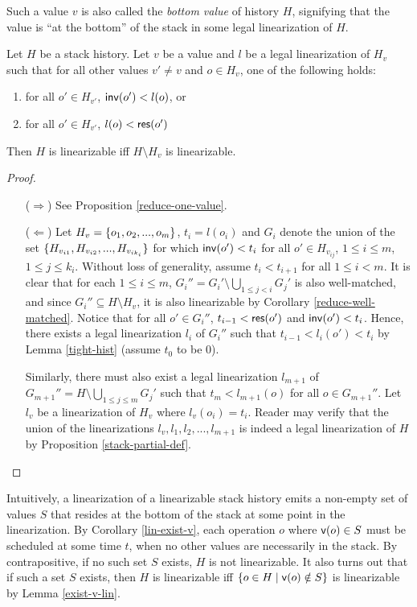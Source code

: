 Such a value $v$ is also called the \emph{bottom value} of history $H$, signifying that the value is ``at the bottom'' of the stack in some legal linearization of $H$.

\begin{lemma}\label{exist-v-lin}
    Let $H$ be a stack history. Let $v$ be a value and $l$ be a legal linearization of $H_v$ such that for all other values $v' \neq v$ and $o \in H_v$, one of the following holds:
    \begin{enumerate}
        \item for all $o' \in H_{v'}$, ${\sf inv}(o') < l(o)$, or
        \item for all $o' \in H_{v'}$, $l(o) < {\sf res}(o')$
    \end{enumerate}
    Then $H$ is linearizable iff $H \setminus H_v$ is linearizable.
\end{lemma}
\begin{proof}
    \begin{itemize}
        \item[($\Rightarrow$)] See Proposition \ref{reduce-one-value}.
        \item[($\Leftarrow$)] Let $H_v = \{o_1, o_2, ..., o_m\}$, $t_i = l(o_i)$ and $G_i$ denote the union of the set $\{H_{v_{i1}}, H_{v_{i2}}, ..., H_{v_{ik_i}}\}$ for which ${\sf inv}(o') < t_i$ for all $o' \in H_{v_{ij}}$, $1 \leq i \leq m$, $1 \leq j \leq k_i$. Without loss of generality, assume $t_i < t_{i+1}$ for all $1 \leq i < m$. It is clear that for each $1 \leq i \leq m$, $G_i'' = G_i' \setminus \bigcup_{1\leq j < i}{G_j'}$ is also well-matched, and since $G_i'' \subseteq H \setminus H_v$, it is also linearizable by Corollary \ref{reduce-well-matched}. Notice that for all $o'\in G_i''$, $t_{i-1} < {\sf res}(o')$ and ${\sf inv}(o') < t_i$. Hence, there exists a legal linearization $l_i$ of $G_i''$ such that $t_{i-1} < l_i(o') < t_i$ by Lemma \ref{tight-hist} (assume $t_0$ to be 0).

Similarly, there must also exist a legal linearization $l_{m+1}$ of $G_{m+1}'' = H \setminus \bigcup_{1\leq j \leq m}{G_j'}$ such that $t_m < l_{m+1}(o)$ for all $o \in G_{m+1}''$. Let $l_v$ be a linearization of $H_v$ where $l_v(o_i) = t_i$. Reader may verify that the union of the linearizations $l_v, l_1, l_2, ..., l_{m+1}$ is indeed a legal linearization of $H$ by Proposition \ref{stack-partial-def}.
    \end{itemize}
\end{proof}

Intuitively, a linearization of a linearizable stack history emits a non-empty set of values $S$ that resides at the bottom of the stack at some point in the linearization. By Corollary \ref{lin-exist-v}, each operation $o$ where ${\sf v}(o) \in S$ must be scheduled at some time $t$, when no other values are necessarily in the stack. By contrapositive, if no such set $S$ exists, $H$ is not linearizable. It also turns out that if such a set $S$ exists, then $H$ is linearizable iff $\{o\in H\;|\;{\sf v}(o) \notin S\}$ is linearizable by Lemma \ref{exist-v-lin}.

